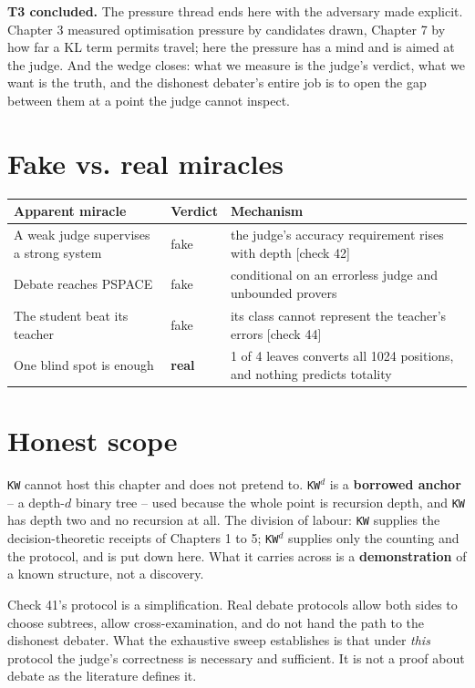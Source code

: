 \textbf{T3 concluded.} The pressure thread ends here with the adversary made explicit. Chapter 3 measured optimisation pressure by candidates drawn, Chapter 7 by how far a KL term permits travel; here the pressure has a mind and is aimed at the judge. And the wedge closes: what we measure is the judge's verdict, what we want is the truth, and the dishonest debater's entire job is to open the gap between them at a point the judge cannot inspect.

\section*{Fake vs. real miracles}

\noindent

\noindent
\begin{tabularx}{\textwidth}{XXX}
\toprule
Apparent miracle & Verdict & Mechanism \\
\midrule
A weak judge supervises a strong system & fake & the judge's accuracy requirement rises with depth [check 42] \\
Debate reaches PSPACE & fake & conditional on an errorless judge and unbounded provers \\
The student beat its teacher & fake & its class cannot represent the teacher's errors [check 44] \\
One blind spot is enough & \textbf{real} & 1 of 4 leaves converts all 1024 positions, and nothing predicts totality \\
\bottomrule
\end{tabularx}
\par\medskip

\section*{Honest scope}

\texttt{KW} cannot host this chapter and does not pretend to. \texttt{KW}$^d$ is a \textbf{borrowed anchor} -- a depth-$d$ binary tree -- used because the whole point is recursion depth, and \texttt{KW} has depth two and no recursion at all. The division of labour: \texttt{KW} supplies the decision-theoretic receipts of Chapters 1 to 5; \texttt{KW}$^d$ supplies only the counting and the protocol, and is put down here. What it carries across is a \textbf{demonstration} of a known structure, not a discovery.

Check 41's protocol is a simplification. Real debate protocols allow both sides to choose subtrees, allow cross-examination, and do not hand the path to the dishonest debater. What the exhaustive sweep establishes is that under \emph{this} protocol the judge's correctness is necessary and sufficient. It is not a proof about debate as the literature defines it.

